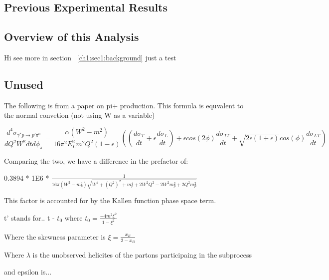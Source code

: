     \subsection{Previous Experimental Results}


    \subsection{Overview of this Analysis}
    
Hi \cite{Bedlinskiy2014ExclusiveAl.} see more in section ~\ref{ch1:sec1:background}
just a test



\iffalse
    \subsection{Unused}
        The following is from a paper on pi+ production. This formula is equvalent to the normal convetion (not using W as a variable)
        
         \begin{equation}\label{xsec}
             \frac{d^4\sigma_{\gamma^*p \rightarrow p'\pi^0}}{dQ^2W^2dtd\phi_{\pi}} =
             \frac{\alpha (W^2-m^2)}{16\pi^2 E^2_L m^2 Q^2 (1-\epsilon)}
             ((\frac{d\sigma_T}{dt}+\epsilon\frac{d\sigma_L}{dt})+
             \epsilon cos(2\phi) \frac{d\sigma_{TT}}{dt} + \sqrt{2\epsilon(1+\epsilon)}cos(\phi)\frac{d\sigma_{LT}}{dt})
        \end{equation}
        
        Comparing the two, we have a difference in the prefactor of:
        
        0.3894 * 1E6 * $\frac{1}{16\pi(W^2-m_p^2)\sqrt{W^4 + (Q^2)^2+m_p^4+2W^2Q^2-2W^2m_p^2+2Q^2m_p^2}}$
        
        This factor is accounted for by the Kallen function phase space term.
        
        
        
        
        t' stands for.. t - $t_0$ where $t_0 = \frac{-4m^2\xi^2}{1-\xi^2}$
        
           Where the skewness parameter is $\xi = \frac{x_B}{2-x_B}$ 
           
        
        
            Where $\lambda$ is the unobserved helicites of the partons participaing in the subprocess
            
         and epsilon is... 
            
            
            
